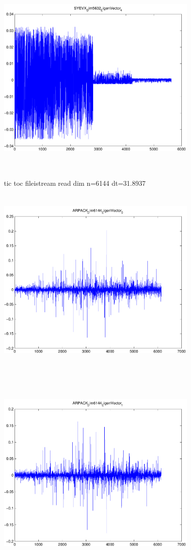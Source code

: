 \documentclass[9pt]{article}
\theoremstyle{plain}
\theoremstyle{definition}
\theoremstyle{remark}
\numberwithin{equation}{section}
\begin{document}
\includegraphics[width=10.0cm,height=10.0cm]{SYEVX_Dim5632_EigenVector_4.pdf}

tic toc fileistream read dim n=6144 dt=31.8937
\includegraphics[width=10.0cm,height=10.0cm]{ARPACK_Dim6144_EigenVector_0.pdf}

\includegraphics[width=10.0cm,height=10.0cm]{ARPACK_Dim6144_EigenVector_1.pdf}
\end{document}
